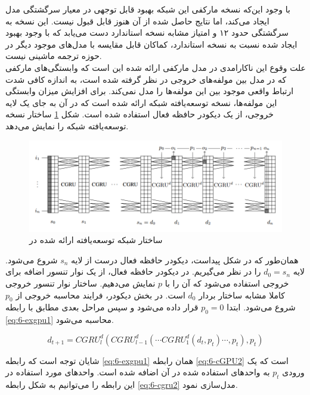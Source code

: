 با وجود این‌که نسخه مارکفی این شبکه بهبود قابل توجهی در معیار سرگشتگی مدل ایجاد می‌کند، اما نتایج حاصل شده از آن هنوز قابل قبول نیست. این نسخه به سرگشتگی حدود ۱۲ و امتیاز  مشابه نسخه استاندارد دست‌ می‌یابد که با وجود بهبود ایجاد شده نسبت به نسخه استاندارد، کماکان قابل مقایسه با مدل‌های موجود دیگر در حوزه ترجمه ماشینی نیست.
\\
علت وقوع این ناکارامدی در مدل مارکفی ارائه شده این است که وابستگی‌های مارکفی که در مدل بین مولفه‌های خروجی در نظر گرفته شده است، به اندازه کافی شدت ارتباط واقعی موجود بین این مولفه‌ها را مدل نمی‌کند. برای افزایش میزان وابستگی این مولفه‌ها، نسخه توسعه‌یافته شبکه ارائه شده است که در آن به جای یک لایه خروجی، از یک دیکودر حافظه فعال استفاده شده است. شکل \ref{fig:6-extendedGPU} ساختار نسخه توسعه‌یافته شبکه  را نمایش می‌دهد.

\begin{figure}[h]
\centering
\includegraphics[scale=0.5]{Imgs/extendedGPU.png}
\caption{ساختار شبکه توسعه‌یافته  ارائه شده در \cite{lukas2017can}}
\label{fig:6-extendedGPU}
\end{figure}

همان‌طور که در شکل پیداست، دیکودر حافظه فعال درست از لایه $s_n$ شروع می‌شود. لایه $d_0 = s_n$ را در نظر می‌گیریم. در دیکودر حافظه فعال، از یک نوار تنسور اضافه برای خروجی استفاده می‌شود که آن را با $p$ نمایش می‌دهیم. ساختار نوار تنسور خروجی کاملا مشابه ساختار بردار $d_0$ است. در بخش دیکودر، فرایند محاسبه خروجی از $p_0$ شروع می‌شود. ابتدا $p_0 = 0$ قرار داده می‌شود و سپس مراحل بعدی مطابق با رابطه \eqref{eq:6-exgpu1} محاسبه می‌شود.


\begin{equation}
d_{t+1} = CGRU_l^d (CGRU_{l-1}^d (\cdots CGRU_1^d(d_t,p_t) \cdots ,p_t),p_t) 
\label{eq:6-exgpu1}
\end{equation}

شایان توجه است که رابطه \eqref{eq:6-exgpu1} همان رابطه \eqref{eq:6-cGPU2} است که یک ورودی $p_t$ به واحد‌های  استفاده شده در آن اضافه شده است. واحدهای  مورد استفاده در این رابطه را می‌توانیم به شکل رابطه \eqref{eq:6-cgru2} مدل‌سازی نمود.

